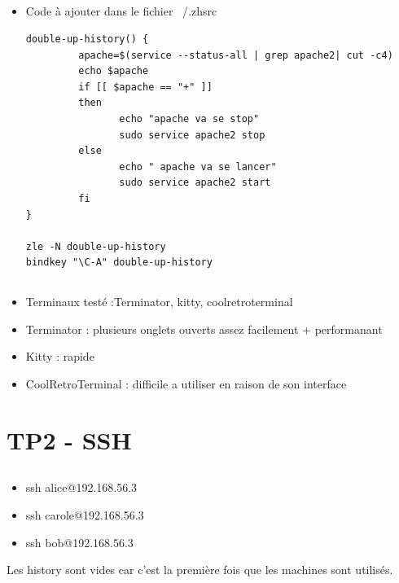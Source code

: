 \documentclass{article}
\begin{document}
\subsection{}
\begin{itemize}
\item Code à ajouter dans le fichier ~/.zhsrc
\begin{lstlisting}
double-up-history() {
         apache=$(service --status-all | grep apache2| cut -c4)
         echo $apache
         if [[ $apache == "+" ]]
         then
                echo "apache va se stop"
                sudo service apache2 stop
         else
                echo " apache va se lancer"
                sudo service apache2 start
         fi
}

zle -N double-up-history
bindkey "\C-A" double-up-history
\end{lstlisting}
\end{itemize}

\subsection{}

\begin{itemize}
    \item Terminaux testé :Terminator, kitty, coolretroterminal
    \item Terminator : plusieurs onglets ouverts assez facilement + performanant
    \item Kitty : rapide
    \item CoolRetroTerminal : difficile a utiliser en raison de son interface
\end{itemize}
\newpage

\section{TP2 - SSH}
\subsection{}
\begin{itemize}
    \item ssh alice@192.168.56.3
    \item ssh carole@192.168.56.3
    \item ssh bob@192.168.56.3
\end{itemize}
Les history sont vides car c'est la première fois que les machines sont utilisés.

\subsection{}
\end{document}
